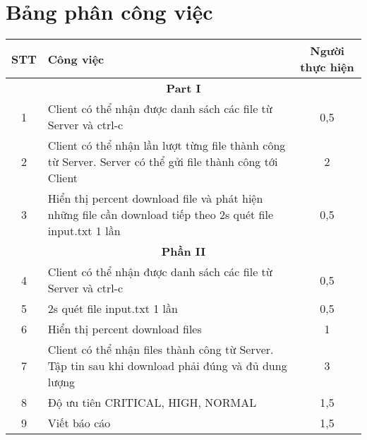 \documentclass[a4paper,12pt]{report}
\begin{document}
\section{Bảng phân công việc}
\begin{center}
  \renewcommand{\arraystretch}{1.5}
  \begin{tabular}{|c|p{}|c|}
    \hline
    \textbf{STT} & \textbf{Công việc}                                                                                         & \textbf{Người thực hiện} \\\hline
    \multicolumn{3}{|c|}{\textbf{Part I}}                                                                                                                \\\hline
    1            & Client có thể nhận được danh sách các file từ Server và ctrl-c                                             & 0,5                      \\\hline
    2            & Client có thể nhận lần lượt từng file thành công từ Server. Server có thể gửi file thành công tới Client   & 2                        \\\hline
    3            & Hiển thị percent download file và phát hiện những file cần download tiếp theo 2s quét file input.txt 1 lần & 0,5                      \\\hline
    \multicolumn{3}{|c|}{\textbf{Phần II}}                                                                                                               \\\hline
    4            & Client có thể nhận được danh sách các file từ Server và ctrl-c                                             & 0,5                      \\\hline
    5            & 2s quét file input.txt 1 lần                                                                               & 0,5                      \\\hline
    6            & Hiển thị percent download files                                                                            & 1                        \\\hline
    7            & Client có thể nhận files thành công từ Server. Tập tin sau khi download phải đúng và đủ dung lượng         & 3                        \\\hline
    8            & Độ ưu tiên CRITICAL, HIGH, NORMAL                                                                          & 1,5                      \\\hline
    9            & Viết báo cáo                                                                                               & 1,5                      \\\hline
  \end{tabular}
\end{center}
\end{document}
